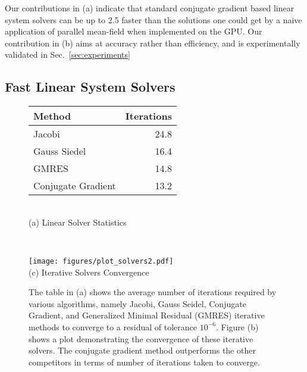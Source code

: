 \documentclass[runningheads]{llncs}
\newcommand{\refsec}[1]{Sec.~{\ref{#1}}}
\begin{document}
 Our contributions in (a) indicate that standard conjugate gradient based linear system solvers can be up to 2.5 faster than the solutions one could get by a 
 naive application of parallel mean-field when implemented on the GPU. Our contribution in (b)  aims at accuracy rather than efficiency, and is experimentally validated in \refsec{sec:experiments}
 
 
\subsection{Fast Linear System Solvers}
\label{sec:solvers}

\begin{figure}[]
\centering

\begin{minipage}{0.4\textwidth} 

\centering
\begin{minipage}{\linewidth} \centering
    \begin{tabular}{l|r }
    \hline
    Method & Iterations \\ \hline Jacobi & 24.8 \\ \hline
    Gauss Siedel & 16.4 \\ \hline
    GMRES & 14.8 \\ \hline
    Conjugate Gradient & 13.2 \\ \hline
    \end{tabular}\\[1mm](a) Linear Solver Statistics
\label{table:solvers}
  \end{minipage} \\[2mm]
\end{minipage} \begin{minipage}{0.5\textwidth}
\centering
\texttt{[image: figures/plot\_solvers2.pdf]}
\\(c) Iterative Solvers Convergence
\end{minipage} \caption{The table in (a) shows the average number of iterations required by various algorithms,
namely Jacobi, Gauss Seidel, Conjugate Gradient, and Generalized Minimal Residual (GMRES) iterative methods
to converge to a residual of tolerance $10^{-6}$. 
Figure (b) shows a plot demonstrating the convergence of these iterative solvers.
The conjugate gradient method outperforms the other competitors in terms of number of iterations taken to converge.
\label{fig:plot_solversa}
}
\end{figure}
\end{document}
